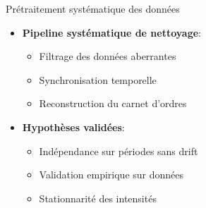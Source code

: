 \documentclass[aspectratio=169]{beamer}  %
\begin{document}
\begin{frame}{Prétraitement systématique des données}
    \begin{itemize}
        \item \textbf{Pipeline systématique de nettoyage}:
        \begin{itemize}
            \item Filtrage des données aberrantes
            \item Synchronisation temporelle
            \item Reconstruction du carnet d'ordres
        \end{itemize}
        \item \textbf{Hypothèses validées}:
        \begin{itemize}
            \item Indépendance sur périodes sans drift
            \item Validation empirique sur données
            \item Stationnarité des intensités
        \end{itemize}
    \end{itemize}
\end{frame}
\end{document}
